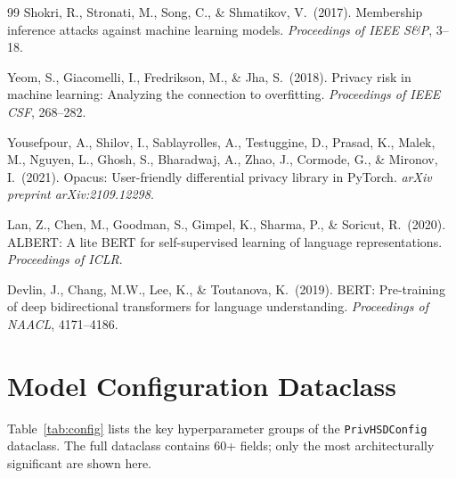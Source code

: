 \documentclass{article}
\begin{document}
{\begin{thebibliography}{99}
  Shokri, R., Stronati, M., Song, C., \& Shmatikov, V.\ (2017).
  Membership inference attacks against machine learning models.
  {\it Proceedings of IEEE S\&P}, 3--18.

  Yeom, S., Giacomelli, I., Fredrikson, M., \& Jha, S.\ (2018).
  Privacy risk in machine learning: Analyzing the connection to overfitting.
  {\it Proceedings of IEEE CSF}, 268--282.

  Yousefpour, A., Shilov, I., Sablayrolles, A., Testuggine, D.,
  Prasad, K., Malek, M., Nguyen, L., Ghosh, S., Bharadwaj, A.,
  Zhao, J., Cormode, G., \& Mironov, I.\ (2021).
  Opacus: User-friendly differential privacy library in PyTorch.
  {\it arXiv preprint arXiv:2109.12298}.

  Lan, Z., Chen, M., Goodman, S., Gimpel, K., Sharma, P., \& Soricut, R.\ (2020).
  ALBERT: A lite BERT for self-supervised learning of language representations.
  {\it Proceedings of ICLR}.

  Devlin, J., Chang, M.W., Lee, K., \& Toutanova, K.\ (2019).
  BERT: Pre-training of deep bidirectional transformers for language understanding.
  {\it Proceedings of NAACL}, 4171--4186.

\end{thebibliography}
}


\appendix
\section{Model Configuration Dataclass}

Table~\ref{tab:config} lists the key hyperparameter groups of the
\texttt{PrivHSDConfig} dataclass. The full dataclass contains 60+
fields; only the most architecturally significant are shown here.
\end{document}
